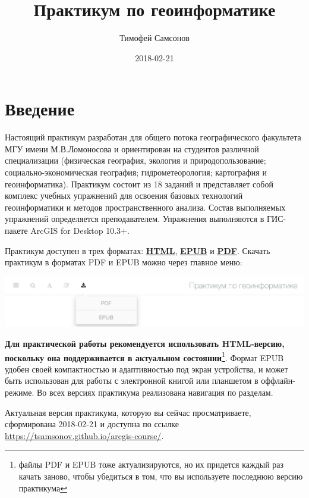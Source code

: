 \documentclass[]{book}
\title{Практикум по геоинформатике}
\author{Тимофей Самсонов}
\date{2018-02-21}
\let\rmarkdownfootnote\footnote%
\def\footnote{\protect\rmarkdownfootnote}
\theoremstyle{definition}
\theoremstyle{definition}
\theoremstyle{definition}
\theoremstyle{remark}
\begin{document}
\maketitle

{
\setcounter{tocdepth}{1}
\tableofcontents
}
\chapter*{Введение}

Настоящий практикум разработан для общего потока географического
факультета МГУ имени М.В.Ломоносова и ориентирован на студентов
различной специализации (физическая география, экология и
природопользование; социально-экономическая география;
гидрометеорология; картография и геоинформатика). Практикум состоит из
18 заданий и представляет собой комплекс учебных упражнений для освоения
базовых технологий геоинформатики и методов пространственного анализа.
Состав выполняемых упражнений определяется преподавателем. Упражнения
выполняются в ГИС-пакете ArcGIS for Desktop 10.3+.

Практикум доступен в трех форматах:
\href{https://tsamsonov.github.io/arcgis-course/}{\textbf{HTML}},
\href{https://tsamsonov.github.io/arcgis-course/arcgis-course.epub}{\textbf{EPUB}}
и
\href{https://tsamsonov.github.io/arcgis-course/arcgis-course.pdf}{\textbf{PDF}}.
Скачать практикум в форматах PDF и EPUB можно через главное меню:

\includegraphics{images/download.png}

\textbf{Для практической работы рекомендуется использовать HTML-версию,
поскольку она поддерживается в актуальном состоянии}\footnote{файлы PDF
  и EPUB тоже актуализируются, но их придется каждый раз качать заново,
  чтобы убедиться в том, что вы используете последнюю версию практикума}.
Формат EPUB удобен своей компактностью и адаптивностью под экран
устройства, и может быть использован для работы с электронной книгой или
планшетом в оффлайн-режиме. Во всех версиях практикума реализована
навигация по разделам.

Актуальная версия практикума, которую вы сейчас просматриваете,
сформирована 2018-02-21 и доступна по ссылке
\url{https://tsamsonov.github.io/arcgis-course/}.
\end{document}
